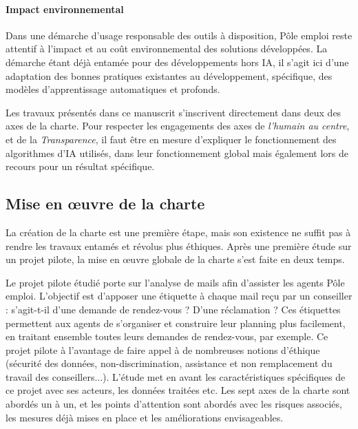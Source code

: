 \paragraph{Impact environnemental}
Dans une démarche d'usage responsable des outils à disposition, Pôle emploi reste attentif à l'impact et au coût environnemental des solutions développées. La démarche étant déjà entamée pour des développements hors IA, il s'agit ici d'une adaptation des bonnes pratiques existantes au développement, spécifique, des modèles d'apprentissage automatiques et profonds.

Les travaux présentés dans ce manuscrit s'inscrivent directement dans deux des axes de la charte. Pour respecter les engagements des axes de \textit{l'humain au centre}, et de la \textit{Transparence}, il faut être en mesure d'expliquer le fonctionnement des algorithmes d'IA utilisés, dans leur fonctionnement global mais également lors de recours pour un résultat spécifique.


\subsection{Mise en œuvre de la charte} \label{C6:ope_charte}

La création de la charte est une première étape, mais son existence ne suffit pas à rendre les travaux entamés et révolus plus éthiques. Après une première étude sur un projet pilote, la mise en œuvre globale de la charte s'est faite en deux temps.

Le projet pilote étudié porte sur l'analyse de mails afin d'assister les agents Pôle emploi. L'objectif est d'apposer une étiquette à chaque mail reçu par un conseiller : s'agit-t-il d'une demande de rendez-vous ? D'une réclamation ? Ces étiquettes permettent aux agents de s'organiser et construire leur planning plus facilement, en traitant ensemble toutes leurs demandes de rendez-vous, par exemple.  Ce projet pilote à l'avantage de faire appel à de nombreuses notions d'éthique (sécurité des données, non-discrimination, assistance et non remplacement du travail des conseillers...).
L'étude met en avant les caractéristiques spécifiques de ce projet avec ses acteurs, les données traitées etc. Les sept axes de la charte sont abordés un à un, et les points d'attention sont abordés avec les risques associés, les mesures déjà mises en place et les améliorations envisageables.

